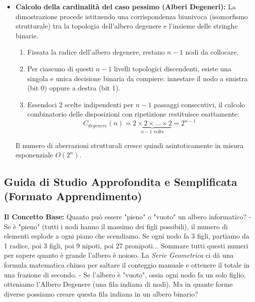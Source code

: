 \documentclass[a4paper, 11pt]{report}
\begin{document}
\begin{itemize}
\begin{itemize}
        \item \textbf{Calcolo della cardinalità del caso pessimo (Alberi Degeneri):}
        La dimostrazione procede istituendo una corrispondenza biunivoca (isomorfismo strutturale) tra la topologia dell'albero degenere e l'insieme delle stringhe binarie.
        \begin{enumerate}
            \item Fissata la radice dell'albero degenere, restano $n-1$ nodi da collocare.
            \item Per ciascuno di questi $n-1$ livelli topologici discendenti, esiste una singola e unica decisione binaria da compiere: innestare il nodo a sinistra (bit 0) oppure a destra (bit 1).
            \item Essendoci $2$ scelte indipendenti per $n-1$ passaggi consecutivi, il calcolo combinatorio delle disposizioni con ripetizione restituisce esattamente:
            \begin{equation*}
            C_{degenere}(n) = \underbrace{2 \times 2 \times \dots \times 2}_{n-1 \text{ volte}} = 2^{n-1}
            \end{equation*}
        \end{enumerate}
        Il numero di aberrazioni strutturali cresce quindi asintoticamente in misura esponenziale $O(2^n)$.
    \end{itemize}
\end{itemize}

\vspace{0.5cm}
\subsection*{Guida di Studio Approfondita e Semplificata (Formato Apprendimento)}



\textbf{Il Concetto Base:}
Quanto può essere "pieno" o "vuoto" un albero informatico?
- Se è "pieno" (tutti i nodi hanno il massimo dei figli possibili), il numero di elementi esplode a ogni piano che scendiamo. Se ogni nodo fa 3 figli, partiamo da 1 radice, poi 3 figli, poi 9 nipoti, poi 27 pronipoti... Sommare tutti questi numeri per sapere quanto è grande l'albero è noioso. La \textit{Serie Geometrica} ci dà una formula matematica chiusa per saltare il conteggio manuale e ottenere il totale in una frazione di secondo.
- Se l'albero è "vuoto", ossia ogni nodo fa un solo figlio, otteniamo l'Albero Degenere (una fila indiana di nodi). Ma in quante forme diverse possiamo creare questa fila indiana in un albero binario?
\end{document}
